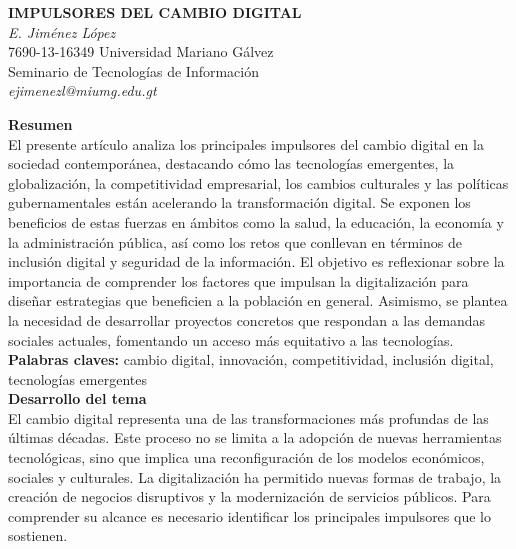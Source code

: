 \documentclass[12pt]{article}
\begin{document}
\begin{center}
\textbf{\MakeUppercase{IMPULSORES DEL CAMBIO DIGITAL}} \\[1ex]
\textit{E. Jiménez López} \\[1ex]
7690-13-16349 Universidad Mariano Gálvez \\
Seminario de Tecnologías de Información \\
\textit{ejimenezl@miumg.edu.gt}
\end{center}

\textbf{Resumen} \\
El presente artículo analiza los principales impulsores del cambio digital en la sociedad contemporánea, 
destacando cómo las tecnologías emergentes, la globalización, la competitividad empresarial, 
los cambios culturales y las políticas gubernamentales están acelerando la transformación digital. 
Se exponen los beneficios de estas fuerzas en ámbitos como la salud, la educación, la economía y 
la administración pública, así como los retos que conllevan en términos de inclusión digital y 
seguridad de la información. El objetivo es reflexionar sobre la importancia de comprender los 
factores que impulsan la digitalización para diseñar estrategias que beneficien a la población en 
general. Asimismo, se plantea la necesidad de desarrollar proyectos concretos que respondan a las 
demandas sociales actuales, fomentando un acceso más equitativo a las tecnologías. \\

\textbf{Palabras claves:} cambio digital, innovación, competitividad, inclusión digital, tecnologías emergentes\\

\textbf{Desarrollo del tema}\\
El cambio digital representa una de las transformaciones más profundas de las últimas décadas. 
Este proceso no se limita a la adopción de nuevas herramientas tecnológicas, sino que implica una 
reconfiguración de los modelos económicos, sociales y culturales. La digitalización ha permitido 
nuevas formas de trabajo, la creación de negocios disruptivos y la modernización de servicios 
públicos. Para comprender su alcance es necesario identificar los principales impulsores que lo 
sostienen.\\
\end{document}

